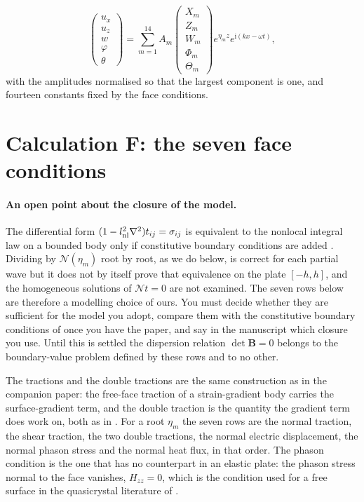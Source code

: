 \documentclass[11pt]{article}
\makeatletter
\newif\ifshowworked
\newenvironment{worked}{%
  \ifshowworked\par\smallskip\noindent\textit{Working.}\par\smallskip\else
  \setbox\z@\vbox\bgroup\fi}{\ifshowworked\par\smallskip\else\egroup\fi}
\newcommand{\ii}{\mathrm{i}}
\newcommand{\Ncal}{\mathcal{N}}
\makeatother
\begin{document}
\begin{equation}
\begin{pmatrix}u_x\\u_z\\w\\\varphi\\\theta\end{pmatrix}
=\sum_{m=1}^{14}A_m
\begin{pmatrix}X_m\\Z_m\\W_m\\\Phi_m\\\Theta_m\end{pmatrix}
e^{\eta_m z}e^{\ii(kx-\omega t)} ,
\end{equation}
with the amplitudes normalised so that the largest component is one, and fourteen constants fixed by the
face conditions.

\section{Calculation F: the seven face conditions}\label{sec:calcF}

\paragraph{An open point about the closure of the model.} The differential form $(1-l_{\rm nl}^2\nabla^2)t_{ij}=\sigma_{ij}$ is equivalent to the nonlocal integral law on a bounded body only if constitutive boundary conditions are added \cite{Barretta2018}. Dividing by $\Ncal(\eta_m)$ root by root, as we do below, is correct for each partial wave but it does not by itself prove that equivalence on the plate $[-h,h]$, and the homogeneous solutions of $\Ncal t=0$ are not examined. The seven rows below are therefore a modelling choice of ours. You must decide whether they are sufficient for the model you adopt, compare them with the constitutive boundary conditions of \cite{Lim2015} once you have the paper, and say in the manuscript which closure you use. Until this is settled the dispersion relation $\det\mathbf B=0$ belongs to the boundary-value problem defined by these rows and to no other.

\begin{worked}
The tractions and the double tractions are the same construction as in the companion paper: the free-face
traction of a strain-gradient body carries the surface-gradient term, and the double traction is the
quantity the gradient term does work on, both as in \cite[Sec.~2, Eq.~(14)]{Charal2019}.
For a root $\eta_m$ the seven rows are the normal traction, the shear traction, the two double tractions,
the normal electric displacement, the normal phason stress and the normal heat flux, in that order.
The phason condition is the one that has no counterpart in an elastic plate: the phason stress normal to
the face vanishes, $H_{zz}=0$, which is the condition used for a free surface in the quasicrystal
literature of \cite{Zhang2021}.
\end{worked}
\end{document}
